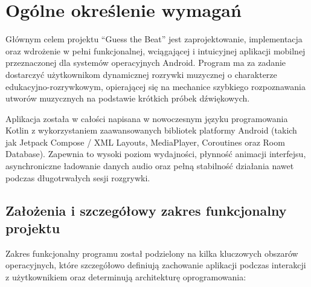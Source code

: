 \newpage
\section{Ogólne określenie wymagań}		%

\hspace{0.60cm}Głównym celem projektu ``Guess the Beat'' jest zaprojektowanie, implementacja oraz wdrożenie w pełni funkcjonalnej, wciągającej i intuicyjnej aplikacji mobilnej przeznaczonej dla systemów operacyjnych Android. Program ma za zadanie dostarczyć użytkownikom dynamicznej rozrywki muzycznej o charakterze edukacyjno-rozrywkowym, opierającej się na mechanice szybkiego rozpoznawania utworów muzycznych na podstawie krótkich próbek dźwiękowych. 

Aplikacja została w całości napisana w nowoczesnym języku programowania Kotlin z wykorzystaniem zaawansowanych bibliotek platformy Android (takich jak Jetpack Compose / XML Layouts, MediaPlayer, Coroutines oraz Room Database). Zapewnia to wysoki poziom wydajności, płynność animacji interfejsu, asynchroniczne ładowanie danych audio oraz pełną stabilność działania nawet podczas długotrwałych sesji rozgrywki.

\subsection{Założenia i szczegółowy zakres funkcjonalny projektu}  %

\hspace{0.60cm}Zakres funkcjonalny programu został podzielony na kilka kluczowych obszarów operacyjnych, które szczegółowo definiują zachowanie aplikacji podczas interakcji z użytkownikiem oraz determinują architekturę oprogramowania:

